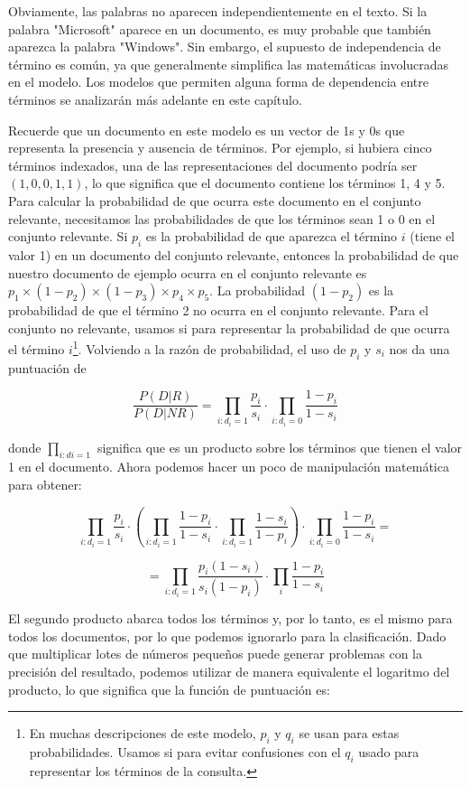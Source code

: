 Obviamente, las palabras no aparecen independientemente en el texto. Si la palabra "Microsoft" aparece en un documento, es muy probable que también aparezca la palabra "Windows". Sin embargo, el supuesto de independencia de término es común, ya que generalmente simplifica las matemáticas involucradas en el modelo. Los modelos que permiten alguna forma de dependencia entre términos se analizarán más adelante en este capítulo.

Recuerde que un documento en este modelo es un vector de 1s y 0s que representa la presencia y ausencia de términos. Por ejemplo, si hubiera cinco términos indexados, una de las representaciones del documento podría ser $(1, 0, 0, 1, 1)$, lo que significa que el documento contiene los términos 1, 4 y 5. Para calcular la probabilidad de que ocurra este documento en el conjunto relevante, necesitamos las probabilidades de que los términos sean 1 o 0 en el conjunto relevante. Si $p_i$ es la probabilidad de que aparezca el término $i$ (tiene el valor 1) en un documento del conjunto relevante, entonces la probabilidad de que nuestro documento de ejemplo ocurra en el conjunto relevante es $p_1\times (1 - p_2) \times (1 - p_3) \times p_4 \times p_5$. La probabilidad $(1 - p_2)$ es la probabilidad de que el término 2 no ocurra en el conjunto relevante. Para el conjunto no relevante, usamos si para representar la probabilidad de que ocurra el término $i$\footnote{En muchas descripciones de este modelo, $p_i$ y $q_i$ se usan para estas probabilidades. Usamos si para evitar confusiones con el $q_i$ usado para representar los términos de la consulta.}. Volviendo a la razón de probabilidad, el uso de $p_i$ y $s_i$ nos da una puntuación de

$$\frac{P(D|R)}{P(D|NR)} = \prod_{i:d_i=1}\frac{p_i}{s_i}\cdot \prod_{i:d_i=0}\frac{1-p_i}{1-s_i}$$

donde $\prod_{i: di = 1}$ significa que es un producto sobre los términos que tienen el valor 1 en el documento. Ahora podemos hacer un poco de manipulación matemática para obtener:

$$\prod_{i:d_i=1}\frac{p_i}{s_i}\cdot \left(\prod_{i:d_i=1}\frac{1-p_i}{1-s_i} \cdot \prod_{i:d_i=1}\frac{1-s_i}{1-p_i}\right)\cdot \prod_{i:d_i=0}\frac{1-p_i}{1-s_i}=$$

$$ = \prod_{i:d_i=1}\frac{p_i(1-s_i)}{s_i(1-p_i)}\cdot \prod_{i}\frac{1-p_i}{1-s_i}$$

El segundo producto abarca todos los términos y, por lo tanto, es el mismo para todos los documentos, por lo que podemos ignorarlo para la clasificación. Dado que multiplicar lotes de números pequeños puede generar problemas con la precisión del resultado, podemos utilizar de manera equivalente el logaritmo del producto, lo que significa que la función de puntuación es:

